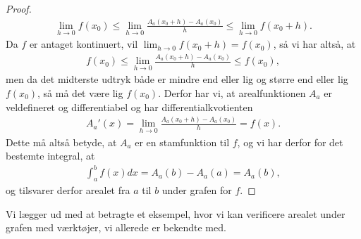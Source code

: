 \begin{proof}
\begin{align*}
		\lim_{h \to 0}f(x_0) \leq \lim_{h \to 0}\frac{A_a(x_0 + h)-A_a(x_0)}{h} \leq \lim_{h \to 0}f(x_0 + h).
	\end{align*}
	Da $f$ er antaget kontinuert, vil $\displaystyle\lim_{h\to 0}f(x_0 + h) = f(x_0)$, så vi har altså, at 
	\begin{align*}
		f(x_0) \leq \lim_{h \to 0}\frac{A_a(x_0 + h)-A_a(x_0)}{h} \leq f(x_0),
	\end{align*}
	men da det midterste udtryk både er mindre end eller lig og større end eller lig $f(x_0)$, så må det være lig 
	$f(x_0)$. Derfor har vi, at arealfunktionen $A_a$ er veldefineret og differentiabel og har differentialkvotienten
	\begin{align*}
		A_a'(x) = \lim_{h \to 0}\frac{A_a(x_0 + h)-A_a(x_0)}{h} = f(x).
	\end{align*}
	Dette må altså betyde, at $A_a$ er en stamfunktion til $f$, og vi har derfor for det bestemte integral, at
	\begin{align*}
		\int_{a}^b f(x) dx = A_a(b) - A_a(a) = A_a(b),
	\end{align*}
	og tilsvarer derfor arealet fra $a$ til $b$ under grafen for $f$. 
\end{proof}
Vi lægger ud med at betragte et eksempel, hvor vi kan verificere arealet under grafen med værktøjer, vi allerede er bekendte med.
